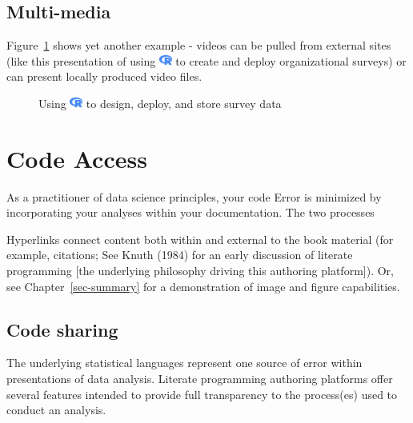 \documentclass[
  letterpaper,
  DIV=11,
  numbers=noendperiod,
  oneside]{scrreprt}
\begin{document}
\section{Multi-media}\label{multi-media}

Figure~\ref{fig-pink} shows yet another example - videos can be pulled
from external sites (like this presentation of using
\includegraphics[width=1.13em,height=1em]{summary_files/figure-pdf/fa-icon-4912d291b82ba7bbcd2aacb159b216f4.pdf}
to create and deploy organizational surveys) or can present locally
produced video files.

\begin{figure}


\caption{\label{fig-pink}Using
\includegraphics[width=1.13em,height=1em]{summary_files/figure-pdf/fa-icon-4912d291b82ba7bbcd2aacb159b216f4.pdf}
to design, deploy, and store survey data}

\end{figure}%


\chapter{Code Access}\label{code-access}

As a practitioner of data science principles, your code Error is
minimized by incorporating your analyses within your documentation. The
two processes

Hyperlinks connect content both within and external to the book material
(for example, citations; See Knuth (1984) for an early discussion of
literate programming {[}the underlying philosophy driving this authoring
platform{]}). Or, see Chapter~\ref{sec-summary} for a demonstration of
image and figure capabilities.

\section{Code sharing}\label{code-sharing}

The underlying statistical languages represent one source of error
within presentations of data analysis. Literate programming authoring
platforms offer several features intended to provide full transparency
to the process(es) used to conduct an analysis.
\end{document}
